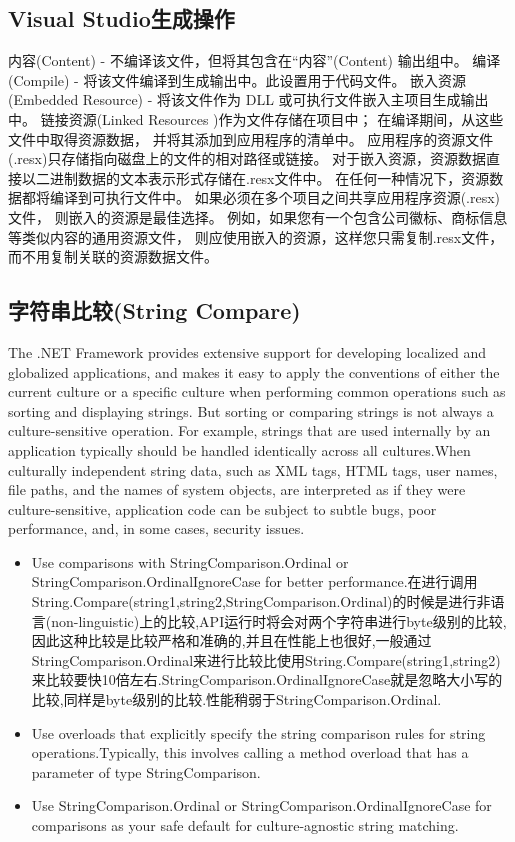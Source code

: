 \documentclass{book}
\begin{document}
\subsection{Visual Studio生成操作}

内容(Content) - 不编译该文件，但将其包含在“内容”(Content) 输出组中。
编译(Compile) - 将该文件编译到生成输出中。此设置用于代码文件。 
嵌入资源(Embedded Resource) - 将该文件作为 DLL 或可执行文件嵌入主项目生成输出中。
链接资源(Linked Resources )作为文件存储在项目中；
在编译期间，从这些文件中取得资源数据，
并将其添加到应用程序的清单中。 
应用程序的资源文件(.resx)只存储指向磁盘上的文件的相对路径或链接。
对于嵌入资源，资源数据直接以二进制数据的文本表示形式存储在.resx文件中。
在任何一种情况下，资源数据都将编译到可执行文件中。
如果必须在多个项目之间共享应用程序资源(.resx) 文件，
则嵌入的资源是最佳选择。 例如，如果您有一个包含公司徽标、商标信息等类似内容的通用资源文件，
则应使用嵌入的资源，这样您只需复制.resx文件，而不用复制关联的资源数据文件。

\subsection{字符串比较(String Compare)}

The .NET Framework provides extensive support for developing localized and globalized applications, 
and makes it easy to apply the conventions of either the current culture 
or a specific culture when performing common operations such as sorting and displaying strings.
But sorting or comparing strings is not always a culture-sensitive operation.
For example, strings that are used internally by an application typically should 
be handled identically across all cultures.When culturally independent string data, 
such as XML tags, HTML tags, user names, file paths, and the names of system objects, 
are interpreted as if they were culture-sensitive, 
application code can be subject to subtle bugs, poor performance, 
and, in some cases, security issues.

\begin{itemize}
\item{Use comparisons with StringComparison.Ordinal or StringComparison.OrdinalIgnoreCase for better performance.}在进行调用String.Compare(string1,string2,StringComparison.Ordinal)的时候是进行非语言(non-linguistic)上的比较,API运行时将会对两个字符串进行byte级别的比较,因此这种比较是比较严格和准确的,并且在性能上也很好,一般通过StringComparison.Ordinal来进行比较比使用String.Compare(string1,string2)来比较要快10倍左右.StringComparison.OrdinalIgnoreCase就是忽略大小写的比较,同样是byte级别的比较.性能稍弱于StringComparison.Ordinal.
\item{Use overloads that explicitly specify the string comparison rules for string operations.Typically, this involves calling a method overload that has a parameter of type StringComparison.}
\item{Use StringComparison.Ordinal or StringComparison.OrdinalIgnoreCase for comparisons as your safe default for culture-agnostic string matching.}
\end{itemize}
\end{document}
